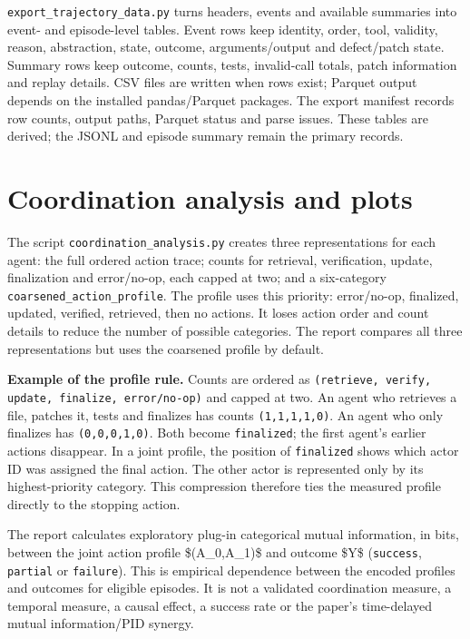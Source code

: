 \documentclass[12pt,a4paper,oneside]{report}
\begin{document}
\texttt{export\allowbreak\_trajectory\allowbreak\_data.py} turns headers, events and available summaries into event- and episode-level tables. Event rows keep identity, order, tool, validity, reason, abstraction, state, outcome, arguments/output and defect/patch state. Summary rows keep outcome, counts, tests, invalid-call totals, patch information and replay details. CSV files are written when rows exist; Parquet output depends on the installed pandas/Parquet packages. The export manifest records row counts, output paths, Parquet status and parse issues. These tables are derived; the JSONL and episode summary remain the primary records.

\section{Coordination analysis and plots}
The script \texttt{coordination\allowbreak\_analysis.py} creates three representations for each agent: the full ordered action trace; counts for retrieval, verification, update, finalization and error/no-op, each capped at two; and a six-category \texttt{coarsened\allowbreak\_action\allowbreak\_profile}. The profile uses this priority: error/no-op, finalized, updated, verified, retrieved, then no actions. It loses action order and count details to reduce the number of possible categories. The report compares all three representations but uses the coarsened profile by default.

\textbf{Example of the profile rule.} Counts are ordered as \texttt{(retrieve, verify, update, finalize, error/no-op)} and capped at two. An agent who retrieves a file, patches it, tests and finalizes has counts \texttt{(1,1,1,1,0)}. An agent who only finalizes has \texttt{(0,0,0,1,0)}. Both become \texttt{finalized}; the first agent’s earlier actions disappear. In a joint profile, the position of \texttt{finalized} shows which actor ID was assigned the final action. The other actor is represented only by its highest-priority category. This compression therefore ties the measured profile directly to the stopping action.

The report calculates exploratory plug-in categorical mutual information, in bits, between the joint action profile \$(A\allowbreak\_0,A\allowbreak\_1)\$ and outcome \$Y\$ (\texttt{success}, \texttt{partial} or \texttt{failure}). This is empirical dependence between the encoded profiles and outcomes for eligible episodes. It is not a validated coordination measure, a temporal measure, a causal effect, a success rate or the paper’s time-delayed mutual information/PID synergy.
\end{document}
